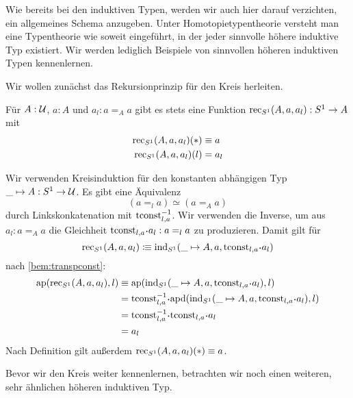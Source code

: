 \begin{bemerkung}
  Wie bereits bei den induktiven Typen, werden wir auch hier darauf verzichten, ein allgemeines Schema anzugeben.
  Unter Homotopietypentheorie versteht man eine Typentheorie wie soweit eingeführt, in der jeder sinnvolle höhere induktive Typ existiert.
  Wir werden lediglich Beispiele von sinnvollen höheren induktiven Typen kennenlernen.
\end{bemerkung}

Wir wollen zunächst das Rekursionprinzip für den Kreis herleiten.

\begin{bemerkung}
  Für $A:\mathcal{U}$, $a:A$ und $a_l:a=_A a$ gibt es stets eine Funktion $\mathrm{rec}_{S^1}(A,a,a_l):S^1\to A$ mit
  \begin{align*}
    \mathrm{rec}_{S^1}(A,a,a_l)(\ast)&\equiv a \\
    \mathrm{rec}_{S^1}(A,a,a_l)(l)&=a_l
  \end{align*}
\end{bemerkung}
\begin{beweis}
  Wir verwenden Kreisinduktion für den konstanten abhängigen Typ $\_\mapsto A:S^1\to\mathcal{U}$.
  Es gibt eine Äquivalenz
  \[
    (a =_l a) \simeq (a =_A a)
  \]
  durch Linkskonkatenation mit $\mathrm{tconst}_{l,a}^{-1}$.
  Wir verwenden die Inverse, um aus $a_l:a=_A a$ die Gleichheit $\transpconst_{l,a}\kon a_l:a=_l a$ zu produzieren.
  Damit gilt für
  \[
    \rec{S^1}(A,a,a_l)\colonequiv \ind{S^1}(\_\mapsto A, a, \transpconst_{l,a}\kon a_l)
  \]
  nach \cref{bem:transpconst}:
  \begin{align*}
    \mathrm{ap}(\rec{S^1}(A,a,a_l),l)&\equiv \mathrm{ap}(\ind{S^1}(\_\mapsto A, a, \transpconst_{l,a}\kon a_l),l) \\
                                     &=\transpconst_{l,a}^{-1}\kon\mathrm{apd}(\ind{S^1}(\_\mapsto A, a, \transpconst_{l,a}\kon a_l),l) \\
                                     &=\transpconst_{l,a}^{-1}\kon\transpconst_{l,a}\kon a_l \\
                                     &=a_l
  \end{align*}
  Nach Definition gilt außerdem $\mathrm{rec}_{S^1}(A,a,a_l)(\ast)\equiv a$.
\end{beweis}

Bevor wir den Kreis weiter kennenlernen, betrachten wir noch einen weiteren, sehr ähnlichen höheren induktiven Typ.


